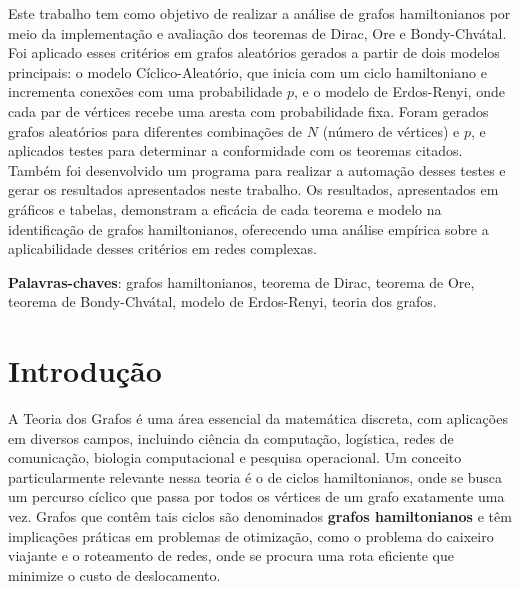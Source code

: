 \documentclass[12pt, openright, oneside, a4paper, chapter=TITLE, section=TITLE, subsection=TITLE, subsubsection=TITLE, brazil]{abntex2}
\begin{document}
\setlength{\absparsep}{18pt} %
\begin{resumo}
Este trabalho tem como objetivo de realizar a análise de grafos hamiltonianos por meio da implementação e avaliação dos teoremas de Dirac, Ore e Bondy-Chvátal. Foi aplicado esses critérios em grafos aleatórios gerados a partir de dois modelos principais: o modelo Cíclico-Aleatório, que inicia com um ciclo hamiltoniano e incrementa conexões com uma probabilidade $p$, e o modelo de Erdos-Renyi, onde cada par de vértices recebe uma aresta com probabilidade fixa. Foram gerados grafos aleatórios para diferentes combinações de $N$ (número de vértices) e $p$, e aplicados testes para determinar a conformidade com os teoremas citados. Também foi desenvolvido um programa para realizar a automação desses testes e gerar os resultados apresentados neste trabalho. Os resultados, apresentados em gráficos e tabelas, demonstram a eficácia de cada teorema e modelo na identificação de grafos hamiltonianos, oferecendo uma análise empírica sobre a aplicabilidade desses critérios em redes complexas.

 \textbf{Palavras-chaves}: grafos hamiltonianos, teorema de Dirac, teorema de Ore, teorema de Bondy-Chvátal, modelo de Erdos-Renyi, teoria dos grafos.
\end{resumo}


\tableofcontents*


\chapter[Introdução]{Introdução}
A Teoria dos Grafos é uma área essencial da matemática discreta, com aplicações em diversos campos, incluindo ciência da computação, logística, redes de comunicação, biologia computacional e pesquisa operacional. Um conceito particularmente relevante nessa teoria é o de ciclos hamiltonianos, onde se busca um percurso cíclico que passa por todos os vértices de um grafo exatamente uma vez. Grafos que contêm tais ciclos são denominados \textbf{grafos hamiltonianos} e têm implicações práticas em problemas de otimização, como o problema do caixeiro viajante e o roteamento de redes, onde se procura uma rota eficiente que minimize o custo de deslocamento.
\end{document}
